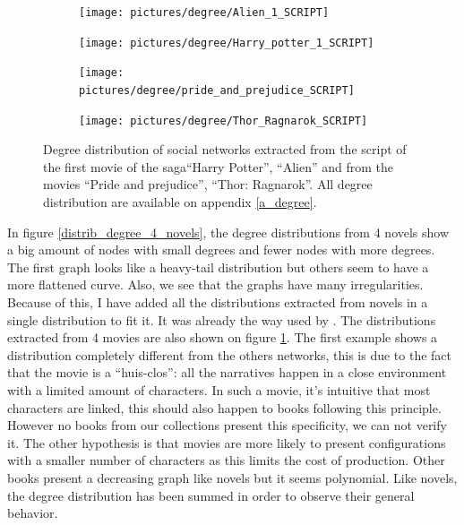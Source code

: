 \documentclass[a4paper, 12pt]{report}
\begin{document}
\begin{figure}
\begin{subfigure}{.49\textwidth}
\centering
\texttt{[image: pictures/degree/Alien\_1\_SCRIPT]}
\end{subfigure}
\hfill
\begin{subfigure}{.49\textwidth}
\centering
\texttt{[image: pictures/degree/Harry\_potter\_1\_SCRIPT]}
\end{subfigure}
\hfill
\begin{subfigure}{.49\textwidth}
\centering
\texttt{[image: pictures/degree/pride\_and\_prejudice\_SCRIPT]}
\end{subfigure}
\begin{subfigure}{.49\textwidth}
\centering
\texttt{[image: pictures/degree/Thor\_Ragnarok\_SCRIPT]}
\end{subfigure}
\caption{Degree distribution of social networks extracted from the script of the first movie of the saga``Harry Potter'', ``Alien'' and from the movies ``Pride and prejudice'', ``Thor: Ragnarok''. All degree distribution are available on appendix \ref{a_degree}.}
\label{distrib_degree_4_scripts}
\end{figure}

In figure \ref{distrib_degree_4_novels}, the degree distributions from 4 novels show a big amount of nodes with small degrees and fewer nodes with more degrees. The first graph looks like a heavy-tail distribution but others seem to have a more flattened curve. Also, we see that the graphs have many irregularities. Because of this, I have added all the distributions extracted from novels in a single distribution to fit it. It was already the way used by \cite{original}.
The distributions extracted from 4 movies are also shown on figure \ref{distrib_degree_4_scripts}. The first example shows a distribution completely different from the others networks, this is due to the fact that the movie is a ``huis-clos'': all the narratives happen in a close environment with a limited amount of characters. In such a movie, it's intuitive that most characters are linked, this should also happen to books following this principle. However no books from our collections present this specificity, we can not verify it. The other hypothesis is that movies are more likely to present configurations with a smaller number of characters as this limits the cost of production. Other books present a decreasing graph like novels but it seems polynomial. Like novels, the degree distribution has been summed in order to observe their general behavior. \\
\end{document}
